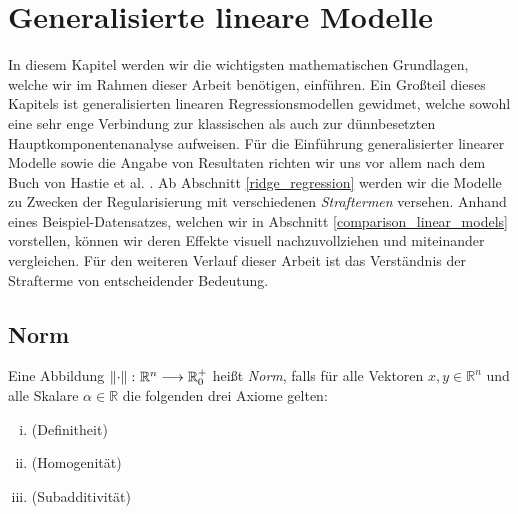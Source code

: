 \chapter{Generalisierte lineare Modelle}

\label{fundamentals}

In diesem Kapitel werden wir die wichtigsten mathematischen Grundlagen, welche wir im Rahmen dieser Arbeit benötigen, einführen. Ein Großteil dieses Kapitels ist generalisierten linearen Regressionsmodellen gewidmet, welche sowohl eine sehr enge Verbindung zur klassischen als auch zur dünnbesetzten Hauptkomponentenanalyse aufweisen. Für die Einführung generalisierter linearer Modelle sowie die Angabe von Resultaten richten wir uns vor allem nach dem Buch von Hastie et al. \cite{hastie_elements}. Ab Abschnitt \ref{ridge_regression} werden wir die Modelle zu Zwecken der Regularisierung mit verschiedenen \textit{Straftermen} versehen. Anhand eines Beispiel-Datensatzes, welchen wir in Abschnitt \ref{comparison_linear_models} vorstellen, können wir deren Effekte visuell nachzuvollziehen und miteinander vergleichen. Für den weiteren Verlauf dieser Arbeit ist das Verständnis der Strafterme von entscheidender Bedeutung.




\section{Norm}

\begin{defn}
\label{norm}
Eine Abbildung $\left\lVert \cdot \right\rVert \colon \mathbb{R}^n \longrightarrow {\mathbb {R} }_{0}^{+}$ heißt \textit{Norm}, falls für alle Vektoren $x,y\in \mathbb{R}^n$ und alle Skalare $\alpha \in \mathbb{R}$ die folgenden drei Axiome gelten:
\begin{enumerate}[(i)]
\item {}(Definitheit)
\item {}(Homogenität)
\item {}(Subadditivität)
\end{enumerate}
\end{defn}

